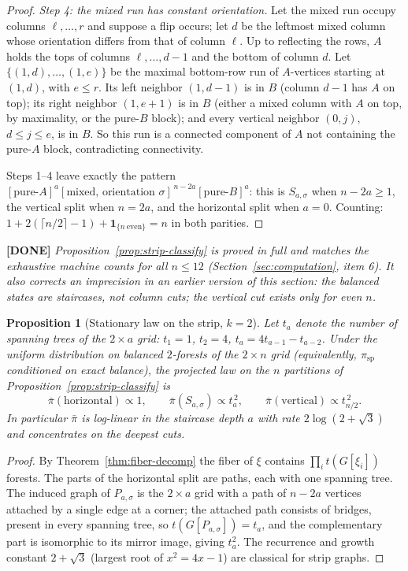 \documentclass[11pt]{article}
\newcommand{\done}[1]{\medskip\noindent\textcolor{donecol}{\textbf{[DONE]} \emph{#1}}\medskip}
\newtheorem{proposition}[theorem]{Proposition}
\begin{document}
\begin{proof}
\emph{Step 4: the mixed run has constant orientation.} Let the mixed run
occupy columns $\ell, \ldots, r$ and suppose a flip occurs; let $d$ be the
leftmost mixed column whose orientation differs from that of column
$\ell$. Up to reflecting the rows, $A$ holds the tops of columns $\ell,
\ldots, d-1$ and the bottom of column $d$. Let $\{(1,d), \ldots, (1,e)\}$
be the maximal bottom-row run of $A$-vertices starting at $(1,d)$, with
$e \le r$. Its left neighbor $(1, d-1)$ is in $B$ (column $d-1$ has $A$
on top); its right neighbor $(1, e+1)$ is in $B$ (either a mixed column
with $A$ on top, by maximality, or the pure-$B$ block); and every vertical
neighbor $(0, j)$, $d \le j \le e$, is in $B$. So this run is a connected
component of $A$ not containing the pure-$A$ block, contradicting
connectivity.

Steps 1--4 leave exactly the pattern
$[\text{pure-}A]^{a} [\text{mixed, orientation } \sigma]^{\,n-2a}
[\text{pure-}B]^{a}$: this is $S_{a,\sigma}$ when $n - 2a \ge 1$, the
vertical split when $n = 2a$, and the horizontal split when $a = 0$.
Counting: $1 + 2(\lceil n/2 \rceil - 1) + \mathbf{1}_{\{n\ \mathrm{even}\}}
= n$ in both parities.
\end{proof}

\done{Proposition~\ref{prop:strip-classify} is proved in full and matches
the exhaustive machine counts for all $n \le 12$
(Section~\ref{sec:computation}, item 6). It also corrects an imprecision in
an earlier version of this section: the balanced states are staircases, not
column cuts; the vertical cut exists only for even $n$.}

\begin{proposition}[Stationary law on the strip, $k = 2$]
\label{prop:strip-law}
Let $t_a$ denote the number of spanning trees of the $2 \times a$ grid:
$t_1 = 1$, $t_2 = 4$, $t_a = 4t_{a-1} - t_{a-2}$. Under the uniform
distribution on balanced $2$-forests of the $2 \times n$ grid (equivalently,
$\pi_{\mathrm{sp}}$ conditioned on exact balance), the projected law on the
$n$ partitions of Proposition~\ref{prop:strip-classify} is
\[
  \bar\pi(\mathrm{horizontal}) \propto 1, \qquad
  \bar\pi(S_{a,\sigma}) \propto t_a^{\,2}, \qquad
  \bar\pi(\mathrm{vertical}) \propto t_{n/2}^{\,2}.
\]
In particular $\bar\pi$ is log-linear in the staircase depth $a$ with rate
$2\log(2 + \sqrt{3})$ and concentrates on the deepest cuts.
\end{proposition}

\begin{proof}
By Theorem~\ref{thm:fiber-decomp} the fiber of $\xi$ contains $\prod_i
t(G[\xi_i])$ forests. The parts of the horizontal split are paths, each
with one spanning tree. The induced graph of $P_{a,\sigma}$ is the
$2 \times a$ grid with a path of $n - 2a$ vertices attached by a single
edge at a corner; the attached path consists of bridges, present in every
spanning tree, so $t(G[P_{a,\sigma}]) = t_a$, and the complementary part is
isomorphic to its mirror image, giving $t_a^2$. The recurrence and growth
constant $2 + \sqrt 3$ (largest root of $x^2 = 4x - 1$) are classical for
strip graphs.
\end{proof}
\end{document}
